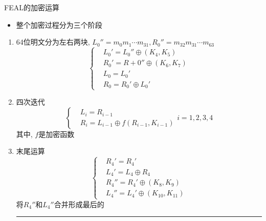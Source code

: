 \documentclass[UTF8]{ctexart}
\newcommand\hl{\bgroup\markoverwith
  {\textcolor{yellow}{\rule[-.5ex]{2pt}{2.5ex}}}\ULon}
\begin{document}
    FEAL的加密运算
    \begin{itemize}
        \renewcommand{\labelitemi}{\scriptsize$\blacksquare$}
        \item 整个加密过程分为三个阶段
    \end{itemize}
    \begin{enumerate}
        \renewcommand\labelenumi{(\theenumi)}
        \item 64位明文分为左右两块, $L_0''=m_0m_1\cdots m_{31}, R_0''=m_{32}m_{31}\cdots m_{63}$
        $$
        \left\{ \begin{aligned}
            &L_0'=L_0''\oplus (K_4, K_5)\\
            &R_0'=R+0''\oplus (K_6, K_7)\\
            &L_0=L_0'\\
            &R_0=R_0'\oplus L_0'
        \end{aligned}\right.
        $$
        \item 四次迭代
        $$
        \left\{ \begin{aligned}
            &L_i=R_{i-1}\\
            &R_i=L_{i-1}\oplus f(R_{i-1}, K_{i-1})
        \end{aligned}\right.
        i=1,2,3,4
        $$
        其中, $f$是加密函数

        \item 末尾运算
        $$
        \left\{ \begin{aligned}
            &R_4'=R_4'\\
            &L_4'=L_4\oplus R_4\\
            &R_4''=R_4'\oplus (K_8, K_9)\\
            &L_4''=L_4'\oplus (K_{10}, K_{11})
        \end{aligned}\right.
        $$
        将$R_4''$和$L_4''$合并形成最后的\hl{64位密文}

    \end{enumerate}
\end{document}
